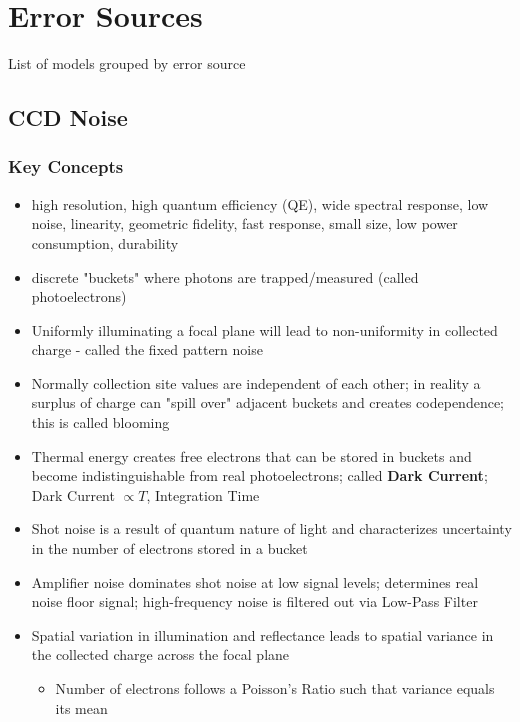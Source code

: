 \chapter{Error Sources}

List of models grouped by error source 

\section{CCD Noise}
\subsection{Key Concepts}
\begin{itemize}
    \item high resolution, high quantum efficiency (QE), wide spectral response, low noise, linearity, geometric fidelity, fast response, small size, low power consumption, durability \cite{radiometric_ccd_camera_calibration}
    \item discrete "buckets" where photons are trapped/measured (called photoelectrons)
    \item Uniformly illuminating a focal plane will lead to non-uniformity in collected charge - called the fixed pattern noise
    \item Normally collection site values are independent of each other; in reality a surplus of charge can "spill over" adjacent buckets and creates codependence; this is called blooming
    \item Thermal energy creates free electrons that can be stored in buckets and become indistinguishable from real photoelectrons; called \textbf{Dark Current}; Dark Current $\propto T$, Integration Time
    \item Shot noise is a result of quantum nature of light and characterizes uncertainty in the number of electrons stored in a bucket
    \item Amplifier noise dominates shot noise at low signal levels; determines real noise floor signal; high-frequency noise is filtered out via Low-Pass Filter
    \item Spatial variation in illumination and reflectance leads to spatial variance in the collected charge across the focal plane
    \begin{itemize}
        \item Number of electrons follows a Poisson's Ratio such that variance equals its mean
    \end{itemize}
\end{itemize}
